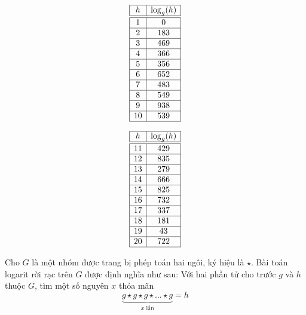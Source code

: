\begin{figure}[H]
\begin{minipage}{0.4\textwidth}
\begin{minipage}{0.4\textwidth}
			$$\begin{array}{|c|c|}
					\hline
					h  & \log_g(h) \\
					\hline
					\hline
					1  & 0         \\
					\hline
					2  & 183       \\
					\hline
					3  & 469       \\
					\hline
					4  & 366       \\
					\hline
					5  & 356       \\
					\hline
					6  & 652       \\
					\hline
					7  & 483       \\
					\hline
					8  & 549       \\
					\hline
					9  & 938       \\
					\hline
					10 & 539       \\
					\hline
				\end{array}$$
		\end{minipage}
		\hfill
		\begin{minipage}{0.4\textwidth}
			$$\begin{array}{|c|c|}
					\hline
					h  & \log_g(h) \\
					\hline
					\hline
					11 & 429       \\
					\hline
					12 & 835       \\
					\hline
					13 & 279       \\
					\hline
					14 & 666       \\
					\hline
					15 & 825       \\
					\hline
					16 & 732       \\
					\hline
					17 & 337       \\
					\hline
					18 & 181       \\
					\hline
					19 & 43        \\
					\hline
					20 & 722       \\
					\hline
				\end{array}$$
		\end{minipage}
	\end{minipage}
\end{figure}

\begin{definition}
	Cho  $G$ là một nhóm được trang bị phép toán hai ngôi, ký hiệu là $\star$. Bài toán logarit rời rạc trên $G$ được định nghĩa như sau: Với hai phần tử cho trước $g$ và $h$ thuộc $G$, tìm một số nguyên $x$ thỏa mãn
	$$ \underbrace{g \star g \star g \star \ldots \star g}_{\text{$x$ lần}} = h$$
\end{definition}

